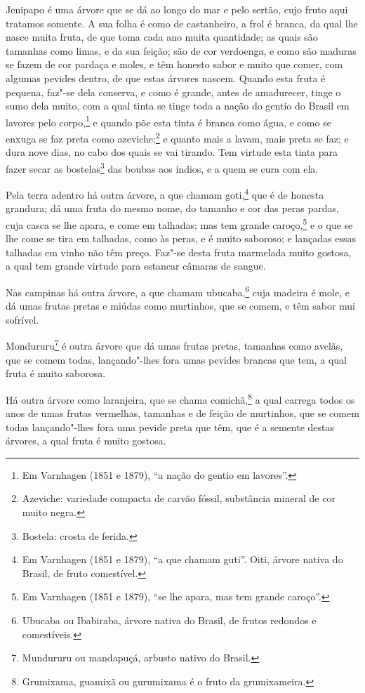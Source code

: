 Jenipapo é uma árvore que se dá ao longo do mar e pelo sertão, cujo fruto aqui tratamos
somente. A sua folha é como de castanheiro, a frol é branca, da qual lhe nasce muita
fruta, de que toma cada ano muita quantidade; as quais são tamanhas como limas, e da sua
feição; são de cor verdoenga, e como são maduras se fazem de cor pardaça e moles, e têm
honesto sabor e muito que comer, com algumas pevides dentro, de que estas árvores nascem.
Quando esta fruta é pequena, faz"-se dela conserva, e como é grande, antes de amadurecer,
tinge o sumo dela muito, com a qual tinta se tinge toda a nação do gentio do Brasil em
lavores pelo corpo,\footnote{ Em Varnhagen (1851 e 1879), ``a nação do gentio em
lavores''.} e quando põe esta tinta é branca como água, e como se enxuga se faz preta como
azeviche;\footnote{ Azeviche: variedade compacta de carvão fóssil, substância mineral de
cor muito negra.} e quanto mais a lavam, mais preta se faz; e dura nove dias, no cabo dos
quais se vai tirando. Tem virtude esta tinta para fazer secar as bostelas\footnote{
Bostela: crosta de ferida.} das boubas aos índios, e a quem se cura com ela.


Pela terra adentro há outra árvore, a que chamam goti,\footnote{ Em Varnhagen (1851 e
1879), ``a que chamam guti''. Oiti, árvore nativa do Brasil, de fruto comestível.} que é
de honesta grandura; dá uma fruta do mesmo nome, do tamanho e cor das peras pardas, cuja
casca se lhe apara, e come em talhadas; mas tem grande caroço,\footnote{ Em Varnhagen
(1851 e 1879), ``se lhe apara, mas tem grande caroço''.} e o que se lhe come se tira em
talhadas, como às peras, e é muito saboroso; e lançadas essas talhadas em vinho não têm
preço. Faz"-se desta fruta marmelada muito gostosa, a qual tem grande virtude para estancar
câmaras de sangue.

Nas campinas há outra árvore, a que chamam ubucaba,\footnote{ Ubucaba ou Ibabiraba, árvore
nativa do Brasil, de frutos redondos e comestíveis.} cuja madeira é mole, e dá umas frutas
pretas e miúdas como murtinhos, que se comem, e têm sabor mui sofrível.

Mondururu\footnote{ Mundururu ou mandapuçá, arbusto nativo do Brasil.} é outra árvore que
dá umas frutas pretas, tamanhas como avelãs, que se comem todas, lançando"-lhes fora umas
pevides brancas que tem, a qual fruta é muito saborosa.

Há outra árvore como laranjeira, que se chama comichã,\footnote{ Grumixama, guamixã ou
gurumixama é o fruto da grumixameira.} a qual carrega todos os anos de umas frutas
vermelhas, tamanhas e de feição de murtinhos, que se comem todas lançando"-lhes fora uma
pevide preta que têm, que é a semente destas árvores, a qual fruta é muito gostosa.

